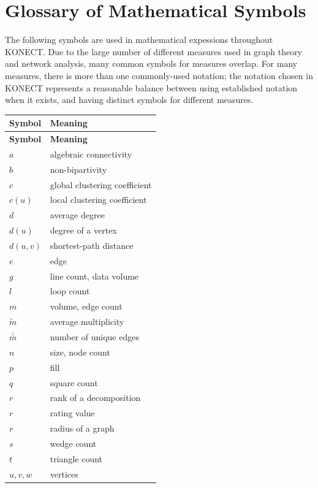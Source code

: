 \documentclass{article}
\begin{document}
\section{Glossary of Mathematical Symbols}

The following symbols are used in mathematical expessions throughout
KONECT.  Due to the large number of different measures used in graph
theory and network analysis, many common symbols for measures overlap.
For many measures, there is more than one commonly-used notation; the
notation chosen in KONECT represents a reasonable balance between using established
notation when it exists, and having distinct symbols for different
measures. \\

\begin{longtable}{ll}
  \toprule
  \textbf{Symbol} & \textbf{Meaning} \\
  \midrule
  \endfirsthead
  \toprule
  \textbf{Symbol} & \textbf{Meaning} \\
  \midrule
  \endhead
  \bottomrule
  \endfoot
  \bottomrule
  \endlastfoot
  $a$ & algebraic connectivity \\
  $b$ & non-bipartivity \\
  $c$ & global clustering coefficient \\
  $c(u)$ & local clustering coefficient \\
  $d$ & average degree \\
  $d(u)$ & degree of a vertex \\
  $d(u,v)$ & shortest-path distance \\
  $e$ & edge \\
  $g$ & line count, data volume \\
  $l$ & loop count \\
  $m$ & volume, edge count \\
  $\tilde{m}$ & average multiplicity \\
  $\bar{\bar m}$ & number of unique edges \\
  $n$ & size, node count \\
  $p$ & fill \\
  $q$ & square count \\
  $r$ & rank of a decomposition \\
  $r$ & rating value \\
  $r$ & radius of a graph \\
  $s$ & wedge count \\
  $t$ & triangle count \\
  $u, v, w$ & vertices \\

\end{longtable}
\end{document}
